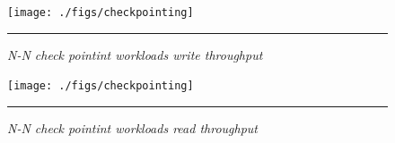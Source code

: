 \begin{figure}[t]  %
\centerline{\texttt{[image: ./figs/checkpointing]}}
\vspace{10pt}
\caption{\normalsize
\textit{N-N check pointint workloads write throughput
}
}
\vspace{10pt}
\hrule
\label{graph:ldb-singlenode}
\end{figure}       %

\begin{figure}[t]  %
\centerline{\texttt{[image: ./figs/checkpointing]}}
\vspace{10pt}
\caption{\normalsize
\textit{N-N check pointint workloads read throughput
}
}
\vspace{10pt}
\hrule
\label{graph:ldb-singlenode}
\end{figure}       %

